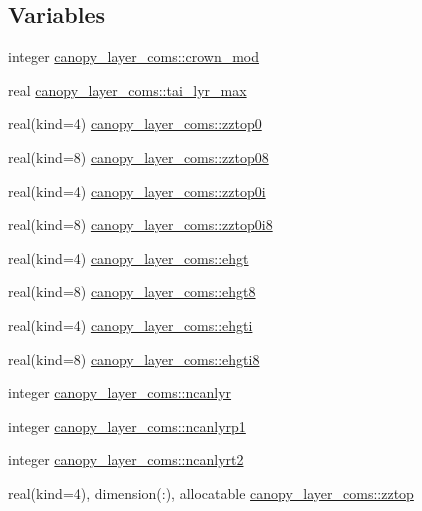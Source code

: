 \subsection*{Variables}
\begin{DoxyCompactItemize}
\item 
integer \hyperlink{namespacecanopy__layer__coms_a0a4553817f56ab7ff99a7dc9e6cec22b}{canopy\+\_\+layer\+\_\+coms\+::crown\+\_\+mod}
\item 
real \hyperlink{namespacecanopy__layer__coms_aba1a315d8e56fdcc8d7bfe67b7b46b50}{canopy\+\_\+layer\+\_\+coms\+::tai\+\_\+lyr\+\_\+max}
\item 
real(kind=4) \hyperlink{namespacecanopy__layer__coms_a4a9b49084021750115ba6985f759d65f}{canopy\+\_\+layer\+\_\+coms\+::zztop0}
\item 
real(kind=8) \hyperlink{namespacecanopy__layer__coms_aea39e98fc9395a5c732a1ff65490f332}{canopy\+\_\+layer\+\_\+coms\+::zztop08}
\item 
real(kind=4) \hyperlink{namespacecanopy__layer__coms_ab48b7d2c659df17ea27720c6864961cc}{canopy\+\_\+layer\+\_\+coms\+::zztop0i}
\item 
real(kind=8) \hyperlink{namespacecanopy__layer__coms_a87b13c528970235894f31da4d23f4573}{canopy\+\_\+layer\+\_\+coms\+::zztop0i8}
\item 
real(kind=4) \hyperlink{namespacecanopy__layer__coms_a6da88578161628f9096dbe2d61db4c3f}{canopy\+\_\+layer\+\_\+coms\+::ehgt}
\item 
real(kind=8) \hyperlink{namespacecanopy__layer__coms_a236bc18bf2479982046b7287875c3cb1}{canopy\+\_\+layer\+\_\+coms\+::ehgt8}
\item 
real(kind=4) \hyperlink{namespacecanopy__layer__coms_aab6d22966359c2d04261309e0241b5f4}{canopy\+\_\+layer\+\_\+coms\+::ehgti}
\item 
real(kind=8) \hyperlink{namespacecanopy__layer__coms_ab064ed626461df7d2504b5443346e926}{canopy\+\_\+layer\+\_\+coms\+::ehgti8}
\item 
integer \hyperlink{namespacecanopy__layer__coms_ac1e7268e66902ffe7c4c002efc1c9562}{canopy\+\_\+layer\+\_\+coms\+::ncanlyr}
\item 
integer \hyperlink{namespacecanopy__layer__coms_ac55175caed42184920cbf845db59561f}{canopy\+\_\+layer\+\_\+coms\+::ncanlyrp1}
\item 
integer \hyperlink{namespacecanopy__layer__coms_a50fbc95bdc5dacc9141c03786d3e48b7}{canopy\+\_\+layer\+\_\+coms\+::ncanlyrt2}
\item 
real(kind=4), dimension(\+:), allocatable \hyperlink{namespacecanopy__layer__coms_a93344c1b6866094b12e1eb38e47b5f1e}{canopy\+\_\+layer\+\_\+coms\+::zztop}

\end{DoxyCompactItemize}
